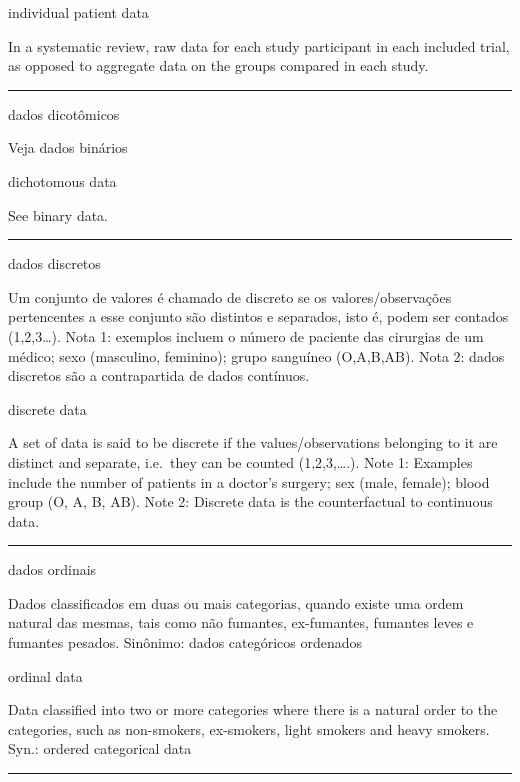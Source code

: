 \documentclass[
]{book}
\begin{document}
individual patient data

In a systematic review, raw data for each study participant in each included trial, as opposed to aggregate data on the groups compared in each study.

\begin{center}\rule{0.5\linewidth}{0.5pt}\end{center}

dados dicotômicos

Veja dados binários

dichotomous data

See binary data.

\begin{center}\rule{0.5\linewidth}{0.5pt}\end{center}

dados discretos

Um conjunto de valores é chamado de discreto se os valores/observações pertencentes a esse conjunto são distintos e separados, isto é, podem ser contados (1,2,3\ldots). Nota 1: exemplos incluem o número de paciente das cirurgias de um médico; sexo (masculino, feminino); grupo sanguíneo (O,A,B,AB). Nota 2: dados discretos são a contrapartida de dados contínuos.

discrete data

A set of data is said to be discrete if the values/observations belonging to it are distinct and separate, i.e.~they can be counted (1,2,3,\ldots.). Note 1: Examples include the number of patients in a doctor's surgery; sex (male, female); blood group (O, A, B, AB). Note 2: Discrete data is the counterfactual to continuous data.

\begin{center}\rule{0.5\linewidth}{0.5pt}\end{center}

dados ordinais

Dados classificados em duas ou mais categorias, quando existe uma ordem natural das mesmas, tais como não fumantes, ex-fumantes, fumantes leves e fumantes pesados. Sinônimo: dados categóricos ordenados

ordinal data

Data classified into two or more categories where there is a natural order to the categories, such as non-smokers, ex-smokers, light smokers and heavy smokers. Syn.: ordered categorical data

\begin{center}\rule{0.5\linewidth}{0.5pt}\end{center}
\end{document}
